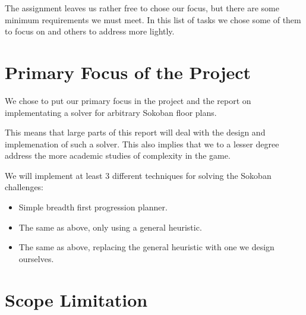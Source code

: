 The assignment leaves us rather free to chose our focus, but there are
some minimum requirements we must meet. In this list of tasks we chose
some of them to focus on and others to address more lightly.

\section{Primary Focus of the Project}
We chose to put our primary focus in the project and the report on
implementating a solver for arbitrary Sokoban floor plans.

This means that large parts of this report will deal with the design
and implemenation of such a solver. This also implies that we to a
lesser degree address the more academic studies of complexity in the
game.

We will implement at least 3 different techniques for solving the
Sokoban challenges:
\begin{itemize}
\item Simple breadth first progression planner. %
\item The same as above, only using a general heuristic.
\item The same as above, replacing the general heuristic with one we design ourselves.
\end{itemize}



\section{Scope Limitation}




